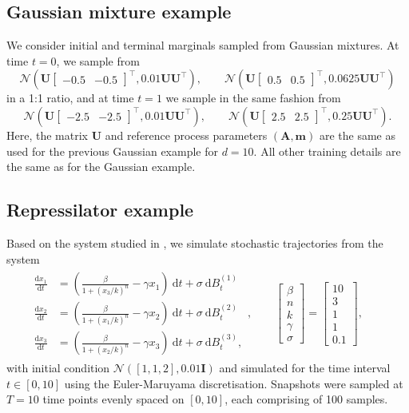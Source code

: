 \documentclass{article}
\newcommand{\diff}{\mathrm{d}}
\newcommand{\Id}{\mathbf{I}}
\newcommand{\Nc}{\mathcal{N}}
\theoremstyle{newstyle}
\begin{document}
\subsection{Gaussian mixture example}

We consider initial and terminal marginals sampled from Gaussian mixtures. At time $t = 0$, we sample from
\[
  \Nc\left(\bm{U} \begin{bmatrix} -0.5 & -0.5 \end{bmatrix}^\top, 0.01\bm{U}\bm{U}^\top \right), \qquad \Nc\left(\bm{U} \begin{bmatrix} 0.5 & 0.5 \end{bmatrix}^\top, 0.0625\bm{U}\bm{U}^\top \right)
\]
in a 1:1 ratio, and at time $t = 1$ we sample in the same fashion from 
\[
  \Nc\left(\bm{U} \begin{bmatrix} -2.5 & -2.5 \end{bmatrix}^\top, 0.01\bm{U}\bm{U}^\top \right), \qquad \Nc\left(\bm{U} \begin{bmatrix} 2.5 & 2.5 \end{bmatrix}^\top, 0.25\bm{U}\bm{U}^\top \right). 
\]
Here, the matrix $\bm{U}$ and reference process parameters $(\bm{A}, \bm{m})$ are the same as used for the previous Gaussian example for $d = 10$.  All other training details are the same as for the Gaussian example. 


\subsection{Repressilator example}

Based on the system studied in \cite{shen2024multi}, we simulate stochastic trajectories from the system
\begin{align}
    \begin{split}   
    \frac{\diff x_1}{\diff t} &= \left(\frac{\beta}{1 + (x_3 / k)^n} - \gamma x_1 \right) \: \diff t + \sigma \: \diff B^{(1)}_t \\ 
    \frac{\diff x_2}{\diff t} &= \left(\frac{\beta}{1 + (x_1 / k)^n} - \gamma x_2 \right) \: \diff t + \sigma \: \diff B^{(2)}_t \\ 
    \frac{\diff x_3}{\diff t} &= \left(\frac{\beta}{1 + (x_2 / k)^n} - \gamma x_3 \right) \: \diff t + \sigma \: \diff B^{(3)}_t, 
    \end{split} , \qquad \begin{bmatrix} \beta \\ n \\ k \\ \gamma \\ \sigma \end{bmatrix} = \begin{bmatrix} 10 \\ 3 \\ 1 \\ 1 \\ 0.1 \end{bmatrix}, \qquad 
    \label{eq:repressilator_sde}
\end{align}
with initial condition $\Nc([1, 1, 2], 0.01\Id)$ and simulated for the time interval $t \in [0, 10]$ using the Euler-Maruyama discretisation. Snapshots were sampled at $T = 10$ time points evenly spaced on $[0, 10]$, each comprising of 100 samples. 
\end{document}

